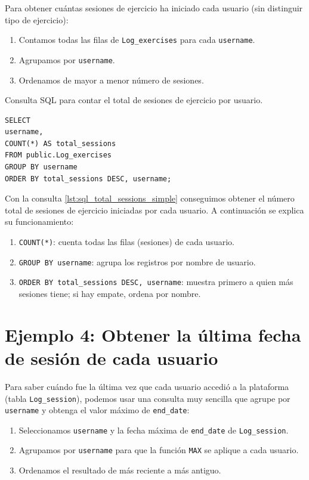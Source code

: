 \documentclass[a4paper, 12pt]{book}
\begin{document}
Para obtener cuántas sesiones de ejercicio ha iniciado cada usuario (sin distinguir tipo de ejercicio):

\begin{enumerate}
    \item Contamos todas las filas de \texttt{Log\_exercises} para cada \texttt{username}.
    \item Agrupamos por \texttt{username}.
    \item Ordenamos de mayor a menor número de sesiones.
\end{enumerate}

\begin{listing}[h!]
\caption{Consulta SQL para contar el total de sesiones de ejercicio por usuario.}
\label{lst:sql_total_sessions_simple}
\begin{verbatim}
SELECT
username,
COUNT(*) AS total_sessions
FROM public.Log_exercises
GROUP BY username
ORDER BY total_sessions DESC, username;
\end{verbatim}
\end{listing}

Con la consulta \ref{lst:sql_total_sessions_simple} conseguimos obtener el número total de sesiones de ejercicio iniciadas por cada usuario. A continuación se explica su funcionamiento:

\begin{enumerate}
    \item \texttt{COUNT(*)}: cuenta todas las filas (sesiones) de cada usuario.
    \item \texttt{GROUP BY username}: agrupa los registros por nombre de usuario.
    \item \texttt{ORDER BY total\_sessions DESC, username}: muestra primero a quien más sesiones tiene; si hay empate, ordena por nombre.
\end{enumerate}

\section{Ejemplo 4: Obtener la última fecha de sesión de cada usuario}

Para saber cuándo fue la última vez que cada usuario accedió a la plataforma (tabla \texttt{Log\_session}), podemos usar una consulta muy sencilla que agrupe por \texttt{username} y obtenga el valor máximo de \texttt{end\_date}:

\begin{enumerate}
    \item Seleccionamos \texttt{username} y la fecha máxima de \texttt{end\_date} de \texttt{Log\_session}.
    \item Agrupamos por \texttt{username} para que la función \texttt{MAX} se aplique a cada usuario.
    \item Ordenamos el resultado de más reciente a más antiguo.
\end{enumerate}
\end{document}
